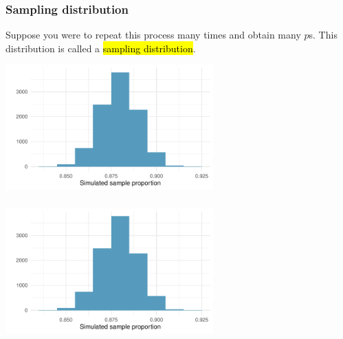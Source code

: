 
\begin{frame}
\frametitle{Sampling distribution}

Suppose you were to repeat this process many times and obtain many $\hat{p}$s. This distribution is called a \hl{sampling distribution}.

\begin{center}
\includegraphics[width=0.6\textwidth]{5-1_point_est_sampling_var/figures/solar-power/solar-power-sampling.pdf}
\end{center}

\end{frame}


\begin{frame}
\frametitle{}


\begin{center}
\includegraphics[width=0.6\textwidth]{5-1_point_est_sampling_var/figures/solar-power/solar-power-sampling.pdf}
\end{center}

$\:$ \\

\end{frame}

